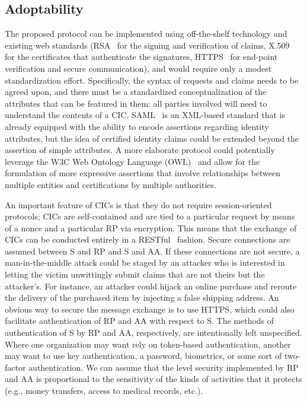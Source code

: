\documentclass[conference]{IEEEtran}
\begin{document}
\subsection{Adoptability}
The proposed protocol can be implemented using off-the-shelf technology and existing web standards (RSA~\cite{rivest1978method} for the signing and verification of claims, X.509~\cite{housley1998internet} for the certificates that authenticate the signatures, HTTPS~\cite{rescorla2000http} for end-point verification and secure communication), and would require only a modest standardization effort. Specifically, the syntax of requests and claims needs to be agreed upon, and there must be a standardized conceptualization of the attributes that can be featured in them: all parties involved will need to understand the contents of a CIC. SAML~\cite{hughes2005security} is an XML-based standard that is already equipped with the ability to encode assertions regarding identity attributes, but the idea of certified identity claims could be extended beyond the assertion of simple attributes. A more elaborate protocol could potentially leverage the W3C Web Ontology Language (OWL)~\cite{bechhofer2009owl} and allow for the formulation of more expressive assertions that involve relationships between multiple entities and certifications by multiple authorities.

An important feature of CICs is that they do not require session-oriented protocols; CICs are self-contained and are tied to a particular request by means of a nonce and a particular {\sf RP} via encryption. This means that the exchange of CICs can be conducted entirely in a RESTful~\cite{fielding2000architectural} fashion. Secure connections are assumed between {\sc S} and {\sc RP} and {\sc S} and {\sc AA}. If these connections are not secure, a man-in-the-middle attack could be staged by an attacker who is interested in letting the victim unwittingly submit claims that are not theirs but the attacker's. For instance, an attacker could hijack an online purchase and reroute the delivery of the purchased item by injecting a false shipping address. An obvious way to secure the message exchange is to use HTTPS, which could also facilitate authentication of {\sc RP} and {\sc AA} with respect to {\sf S}. The methods of authentication of {\sf S} by {\sf RP} and {\sf AA}, respectively, are intentionally left unspecified. Where one organization may want rely on token-based authentication, another may want to use key authentication, a password, biometrics, or some sort of two-factor authentication. We can assume that the level security implemented by {\sf RP} and {\sf AA} is proportional to the sensitivity of the kinds of activities that it protects (e.g., money transfers, access to medical records, etc.). 
\end{document}
